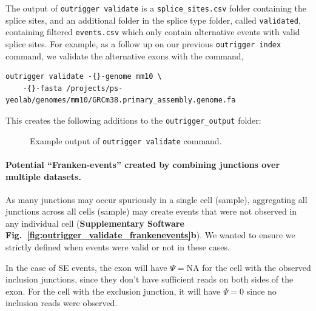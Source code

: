 The output of \texttt{outrigger validate} is a \texttt{splice\_sites.csv} folder containing the splice sites, and an additional folder in the splice type folder, called \texttt{validated}, containing filtered \texttt{events.csv} which only contain alternative events with valid splice sites. For example, as a follow up on our previous \texttt{outrigger index} command, we validate the alternative exons with the command,

\begin{verbatim}
outrigger validate -{}-genome mm10 \
    -{}-fasta /projects/ps-yeolab/genomes/mm10/GRCm38.primary_assembly.genome.fa
\end{verbatim}

This creates the following additions to the \texttt{outrigger\_output} folder:

\begin{figure}
\caption{Example output of \texttt{outrigger validate} command.}
\end{figure}


\paragraph{Potential ``Franken-events'' created by combining junctions over multiple datasets.} As many junctions may occur spuriously in a single cell (sample), aggregating all junctions across all cells (sample) may create events that were not observed in any individual cell (\textbf{Supplementary Software Fig.~\ref{fig:outrigger_validate_frankenevents}b}). We wanted to ensure we strictly defined when events were valid or not in these cases.

In the case of SE events, the exon will have $\Psi = \text{NA}$ for the cell with the observed inclusion junctions, since they don't have sufficient reads on both sides of the exon. For the cell with the exclusion junction, it will have $\Psi = 0$ since no inclusion reads were observed.

